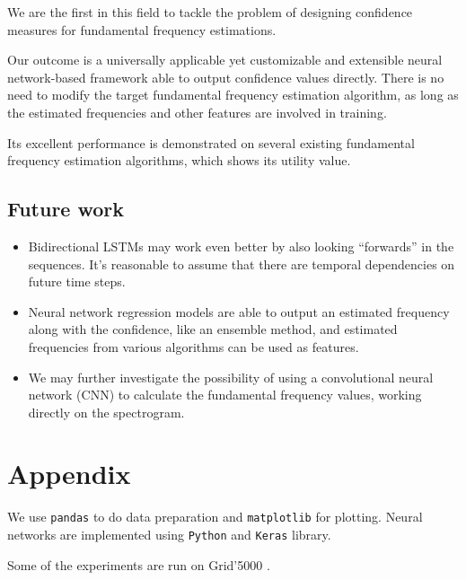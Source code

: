 \documentclass[11pt,a4paper]{report}
\begin{document}
We are the first in this field to tackle the problem of designing confidence measures for fundamental frequency estimations.

Our outcome is a universally applicable yet customizable and extensible neural network-based framework able to output confidence values directly.
There is no need to modify the target fundamental frequency estimation algorithm, as long as the estimated frequencies and other features are involved in training.

Its excellent performance is demonstrated on several existing fundamental frequency estimation algorithms, which shows its utility value.

\section*{Future work}

\begin{itemize}
  \item Bidirectional LSTMs may work even better by also looking \enquote{forwards} in the sequences.
    It's reasonable to assume that there are temporal dependencies on future time steps.
  \item Neural network regression models are able to output an estimated frequency along with the confidence, like an ensemble method, and estimated frequencies from various algorithms can be used as features.
  \item We may further investigate the possibility of using a convolutional neural network (CNN) to calculate the fundamental frequency values, working directly on the spectrogram.
\end{itemize}

\appendix

\chapter{Appendix}

We use \texttt{pandas} \parencite{mckinney2010data} to do data preparation and \texttt{matplotlib} \parencite{hunter2007matplotlib} for plotting.
Neural networks are implemented using \texttt{Python} and \texttt{Keras} \parencite{chollet2015keras} library.

Some of the experiments are run on Grid'5000 \parencite{balouek2012adding}.

\printbibliography
\end{document}
